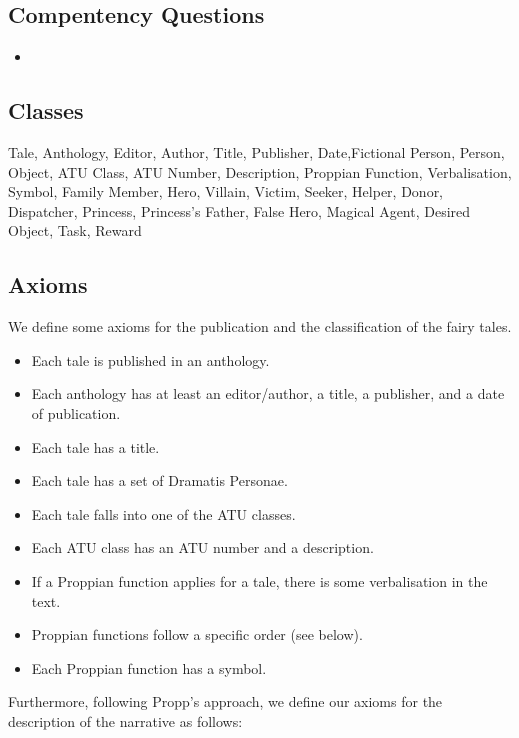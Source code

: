 \documentclass[10pt,a4paper]{article}
\begin{document}
	 \subsection{Compentency Questions}
	 	\begin{itemize}
			\item
		\end{itemize}

	\subsection{Classes}
	\small 
Tale, Anthology, Editor, Author, Title, Publisher, Date,Fictional Person, Person, Object, ATU Class, ATU Number, Description, Proppian Function, Verbalisation, Symbol, Family Member, Hero, Villain, Victim, Seeker, Helper, Donor, Dispatcher, Princess, Princess's Father, False Hero, Magical Agent, Desired Object, Task, Reward 

	\subsection{Axioms}
	
We define some axioms for the publication and the classification of the fairy tales. 
	\small 

\begin{itemize}
		\item Each tale is published in an anthology. 
		\item Each anthology has at least an editor/author, a title, a publisher, and a date of publication.
		\item Each tale has a title. 
		\item Each tale has a set of Dramatis Personae. 
		\item Each tale falls into one of the ATU classes. 
		\item Each ATU class has an ATU number and a description. 
		\item If a Proppian function applies for a tale, there is some verbalisation in the text. 
		\item Proppian functions follow a specific order (see below).
		\item Each Proppian function has a symbol.
\end{itemize}
		
Furthermore, following Propp's approach, we define our axioms for the description of the narrative as follows: 
\newpage 
\end{document}
